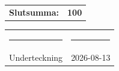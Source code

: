 \documentclass[a4paper,11pt]{article}
\begin{document}
\vspace{0.8cm}


\begin{flushright}

\begin{tabular}{lr}
    \textbf{Slutsumma:} & \textbf{100}
\end{tabular}

\end{flushright}

\vfill


\begin{center}

\begin{tabular}{p{6cm} p{6cm}}
    \rule{6cm}{0.4pt} &
    \rule{6cm}{0.4pt} \\[0.15cm]
    Underteckning &
    2026-08-13
\end{tabular}

\end{center}
\end{document}

